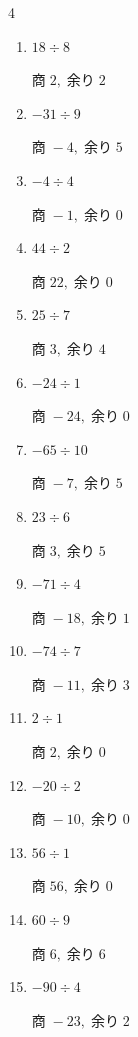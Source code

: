 \begin{multicols}{4}
\begin{enumerate}
  \item $18 \div 8$

        $商\; 2,\; 余り\; 2$

  \item $-31 \div 9$

        $商\; -4,\; 余り\; 5$

  \item $-4 \div 4$

        $商\; -1,\; 余り\; 0$

  \item $44 \div 2$

        $商\; 22,\; 余り\; 0$

  \item $25 \div 7$

        $商\; 3,\; 余り\; 4$

  \item $-24 \div 1$

        $商\; -24,\; 余り\; 0$

  \item $-65 \div 10$

        $商\; -7,\; 余り\; 5$

\columnbreak %

  \item $23 \div 6$

        $商\; 3,\; 余り\; 5$

  \item $-71 \div 4$

        $商\; -18,\; 余り\; 1$

  \item $-74 \div 7$

        $商\; -11,\; 余り\; 3$

  \item $2 \div 1$

        $商\; 2,\; 余り\; 0$

  \item $-20 \div 2$

        $商\; -10,\; 余り\; 0$

  \item $56 \div 1$

        $商\; 56,\; 余り\; 0$

  \item $60 \div 9$

        $商\; 6,\; 余り\; 6$

  \item $-90 \div 4$

        $商\; -23,\; 余り\; 2$


\end{enumerate}
\end{multicols}
